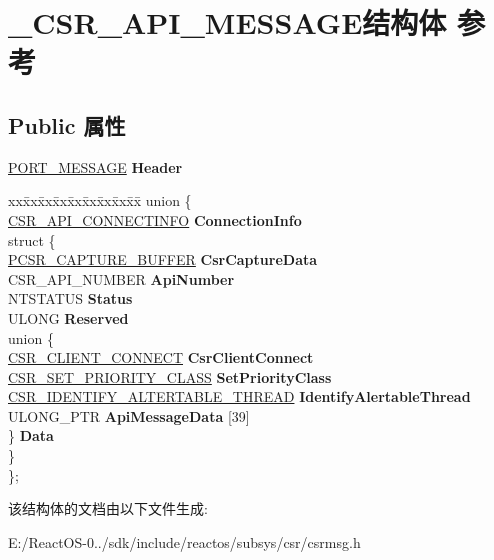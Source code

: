 \hypertarget{struct___c_s_r___a_p_i___m_e_s_s_a_g_e}{}\section{\+\_\+\+C\+S\+R\+\_\+\+A\+P\+I\+\_\+\+M\+E\+S\+S\+A\+G\+E结构体 参考}
\label{struct___c_s_r___a_p_i___m_e_s_s_a_g_e}
\subsection*{Public 属性}
\begin{DoxyCompactItemize}
\item 
\mbox{\label{struct___c_s_r___a_p_i___m_e_s_s_a_g_e_a8300d00de5eb7812dca0100fe3aedeb1}} 
\hyperlink{struct___p_o_r_t___m_e_s_s_a_g_e___h_e_a_d_e_r}{P\+O\+R\+T\+\_\+\+M\+E\+S\+S\+A\+GE} {\bfseries Header}
\item 
\mbox{\label{struct___c_s_r___a_p_i___m_e_s_s_a_g_e_a1a4c7d9b62b4b007a4fff8c37c77904e}} 
\begin{tabbing}
xx\=xx\=xx\=xx\=xx\=xx\=xx\=xx\=xx\=\kill
union \{\\
\>\hyperlink{struct___c_s_r___a_p_i___c_o_n_n_e_c_t_i_n_f_o}{CSR\_API\_CONNECTINFO} {\bfseries ConnectionInfo}\\
\mbox{\label{union___c_s_r___a_p_i___m_e_s_s_a_g_e_1_1_0D2992_aa0fe4f8b40b75c90f20564bc37911b4b}} 
\>struct \{\\
\>\>\hyperlink{struct___c_s_r___c_a_p_t_u_r_e___b_u_f_f_e_r}{PCSR\_CAPTURE\_BUFFER} {\bfseries CsrCaptureData}\\
\>\>CSR\_API\_NUMBER {\bfseries ApiNumber}\\
\>\>NTSTATUS {\bfseries Status}\\
\>\>ULONG {\bfseries Reserved}\\
\>\>union \{\\
\>\>\>\hyperlink{struct___c_s_r___c_l_i_e_n_t___c_o_n_n_e_c_t}{CSR\_CLIENT\_CONNECT} {\bfseries CsrClientConnect}\\
\>\>\>\hyperlink{struct___c_s_r___s_e_t___p_r_i_o_r_i_t_y___c_l_a_s_s}{CSR\_SET\_PRIORITY\_CLASS} {\bfseries SetPriorityClass}\\
\>\>\>\hyperlink{struct___c_s_r___i_d_e_n_t_i_f_y___a_l_t_e_r_t_a_b_l_e___t_h_r_e_a_d}{CSR\_IDENTIFY\_ALTERTABLE\_THREAD} {\bfseries IdentifyAlertableThread}\\
\>\>\>ULONG\_PTR {\bfseries ApiMessageData} \mbox{[}39\mbox{]}\\
\>\>\} {\bfseries Data}\\
\>\} \\
\}; \\

\end{tabbing}\end{DoxyCompactItemize}


该结构体的文档由以下文件生成\+:\begin{DoxyCompactItemize}
\item 
E\+:/\+React\+O\+S-\/0../sdk/include/reactos/subsys/csr/csrmsg.\+h\end{DoxyCompactItemize}

